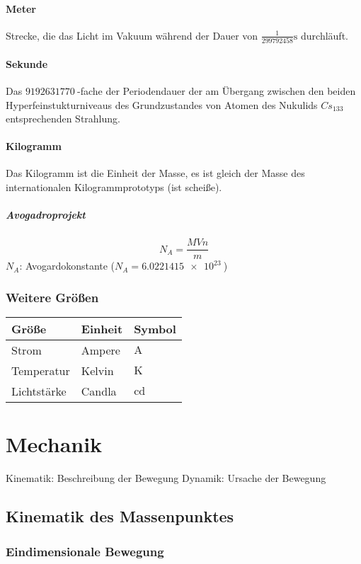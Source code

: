 \documentclass[a4paper]{scrartcl}
\theoremstyle{definition}
\theoremstyle{plain}
\theoremstyle{plain}
\theoremstyle{remark}
\theoremstyle{remark}
\theoremstyle{remark}
\begin{document}
\paragraph{Meter}
\label{sec-1-2-1-1}
Strecke, die das Licht im Vakuum während der Dauer von $\frac{1}{299792458}\si{\second}$ durchläuft.
\paragraph{Sekunde}
\label{sec-1-2-1-2}
Das $\SI{9192631770}{}$-fache  der Periodendauer der am Übergang zwischen den beiden Hyperfeinstukturniveaus des Grundzustandes von Atomen des Nukulids $Cs_{133}$ entsprechenden Strahlung.
\paragraph{Kilogramm}
\label{sec-1-2-1-3}
Das Kilogramm ist die Einheit der Masse, es ist gleich der Masse des internationalen Kilogrammprototyps (ist scheiße).
\subparagraph{Avogadroprojekt}
\label{sec-1-2-1-3-1}
\[N_A = \frac{M V n}{m}\]
$N_A$: Avogardokonstante ($N_A = \SI{6.0221415e23}{}$)
\subsubsection{Weitere Größen}
\label{sec-1-2-2}
\begin{center}
\begin{tabular}{lll}
Größe & Einheit & Symbol\\
\hline
Strom & Ampere & $\si{\ampere}$\\
Temperatur & Kelvin & $\si{\kelvin}$\\
Lichtstärke & Candla & $\si{\candela}$\\
\end{tabular}
\end{center}
\section{Mechanik}
\label{sec-2}
Kinematik: Beschreibung der Bewegung
Dynamik: Ursache der Bewegung

\subsection{Kinematik des Massenpunktes}
\label{sec-2-1}
\subsubsection{Eindimensionale Bewegung}
\label{sec-2-1-1}
\end{document}
